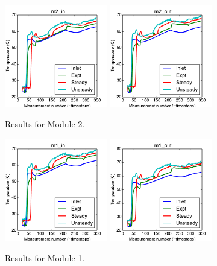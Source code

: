 \documentclass{article}
\begin{document}
\clearpage
\begin{figure}[!ht]
\centering
\includegraphics[width=0.4\textwidth]{../../data/ICSolar/images/Feb6_m2_in_compare.pdf}\hspace{0.05\textwidth}
\includegraphics[width=0.4\textwidth]{../../data/ICSolar/images/Feb6_m2_out_compare.pdf}\hspace{0.05\textwidth}\\
\caption{Results for Module 2.}\end{figure}
\begin{figure}[!ht]
\centering
\includegraphics[width=0.4\textwidth]{../../data/ICSolar/images/Feb6_m1_in_compare.pdf}\hspace{0.05\textwidth}
\includegraphics[width=0.4\textwidth]{../../data/ICSolar/images/Feb6_m1_out_compare.pdf}\hspace{0.05\textwidth}\\
\caption{Results for Module 1.}\end{figure}
\end{document}

